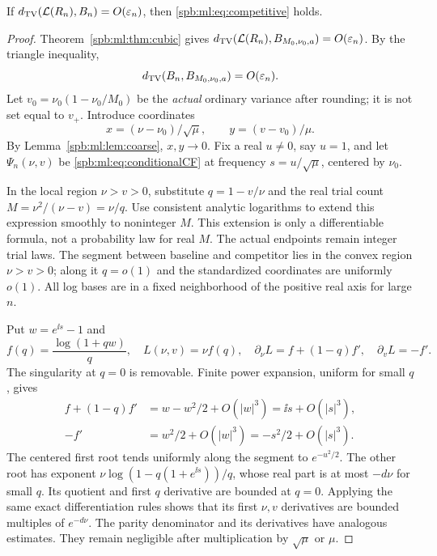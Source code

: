 \begin{proposition}\label{spb:ml:prop:fine}
If $d_{\mathrm{TV}}(\mathcal L(R_n),B_n)=O(\varepsilon_n)$, then \eqref{spb:ml:eq:competitive} holds.
\end{proposition}
\begin{proof}
Theorem~\ref{spb:ml:thm:cubic} gives $d_{\mathrm{TV}}(\mathcal L(R_n),B_{M_0,\nu_0,a})=O(\varepsilon_n)$. By the triangle inequality,
\begin{equation}\label{spb:ml:eq:baselineTV}
 d_{\mathrm{TV}}(B_n,B_{M_0,\nu_0,a})=O(\varepsilon_n).
\end{equation}
Let $v_0=\nu_0(1-\nu_0/M_0)$ be the \emph{actual} ordinary variance after rounding; it is not set equal to $v_+$. Introduce coordinates
\begin{equation}\label{spb:ml:eq:xy}
 x=(\nu-\nu_0)/\sqrt\mu,\qquad y=(v-v_0)/\mu.
\end{equation}
By Lemma~\ref{spb:ml:lem:coarse}, $x,y\to0$. Fix a real $u\ne0$, say $u=1$, and let $\Psi_n(\nu,v)$ be \eqref{spb:ml:eq:conditionalCF} at frequency $s=u/\sqrt\mu$, centered by $\nu_0$.

In the local region $\nu>v>0$, substitute $q=1-v/\nu$ and the real trial count $M=\nu^2/(\nu-v)=\nu/q$. Use consistent analytic logarithms to extend this expression smoothly to noninteger $M$. This extension is only a differentiable formula, not a probability law for real $M$. The actual endpoints remain integer trial laws. The segment between baseline and competitor lies in the convex region $\nu>v>0$; along it $q=o(1)$ and the standardized coordinates are uniformly $o(1)$. All log bases are in a fixed neighborhood of the positive real axis for large $n$.

Put $w=e^{\ii s}-1$ and
\begin{equation}\label{spb:ml:eq:exactderivatives}
 f(q)=\frac{\log(1+qw)}q,\quad L(\nu,v)=\nu f(q),\quad
 \partial_\nu L=f+(1-q)f',\quad \partial_vL=-f'.
\end{equation}
The singularity at $q=0$ is removable. Finite power expansion, uniform for small $q$, gives
\begin{align}
 f+(1-q)f'&=w-w^2/2+O(|w|^3)=\ii s+O(|s|^3),\label{spb:ml:eq:derasymp}\\
 -f'&=w^2/2+O(|w|^3)=-s^2/2+O(|s|^3).\nonumber
\end{align}
The centered first root tends uniformly along the segment to $e^{-u^2/2}$. The other root has exponent
$\nu\log(1-q(1+e^{\ii s}))/q$, whose real part is at most $-d\nu$ for small $q$. Its quotient and first $q$ derivative are bounded at $q=0$. Applying the same exact differentiation rules shows that its first $\nu,v$ derivatives are bounded multiples of $e^{-d\nu}$. The parity denominator and its derivatives have analogous estimates. They remain negligible after multiplication by $\sqrt\mu$ or $\mu$.


\end{proof}
